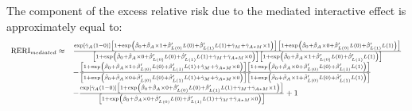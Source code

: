 \documentclass[
]{book}
\begin{document}
The component of the excess relative risk due to the mediated interactive effect is approximately equal to:
\[\small
\begin{array}{rl}
\text{RERI}_{mediated} \approx  & \frac{\exp \left[ \hat{\gamma}_A (1 - 0)\right] \left[1 + \exp \left(\hat{\beta}_0 + \hat{\beta}_A \times 1 + \hat{\beta}_{L(0)}^\prime L(0) + \hat{\beta}_{L(1)}^\prime L(1) + \hat{\gamma}_M + \hat{\gamma}_{A \ast M} \times 1\right) \right] \left[1 + \exp \left(\hat{\beta}_0 + \hat{\beta}_A \times 0 + \hat{\beta}_{L(0)}^\prime L(0) + \hat{\beta}_{L(1)}^\prime L(1)\right) \right]}{\left[ 1 + \exp \left(\hat{\beta}_0 + \hat{\beta}_A \times 0 + \hat{\beta}_{L(0)}^\prime L(0) + \hat{\beta}_{L(1)}^\prime L(1) + \hat{\gamma}_M + \hat{\gamma}_{A \ast M} \times 0\right)\right] \left[ 1 + \exp \left(\hat{\beta}_0 + \hat{\beta}_A \times 1 + \hat{\beta}_{L(0)}^\prime L(0) + \hat{\beta}_{L(1)}^\prime L(1) \right) \right]} \\
                                & - \frac{\left[1 + \exp \left(\hat{\beta}_0 + \hat{\beta}_A \times 1 + \hat{\beta}_{L(0)}^\prime L(0) + \hat{\beta}_{L(1)}^\prime L(1) + \hat{\gamma}_M + \hat{\gamma}_{A \ast M} \times 0\right) \right] \left[1 + \exp \left(\hat{\beta}_0 + \hat{\beta}_A \times 0 + \hat{\beta}_{L(0)}^\prime L(0) + \hat{\beta}_{L(1)}^\prime L(1) \right) \right]}{\left[ 1 + \exp \left(\hat{\beta}_0 + \hat{\beta}_A \times 0 + \hat{\beta}_{L(0)}^\prime L(0) + \hat{\beta}_{L(1)}^\prime L(1) + \hat{\gamma}_M + \hat{\gamma}_{A \ast M} \times 0 \right)\right] \left[ 1 + \exp \left(\hat{\beta}_0 + \hat{\beta}_A \times 1 + \hat{\beta}_{L(0)}^\prime L(0) + \hat{\beta}_{L(1)}^\prime L(1)  \right) \right]} \\
                                & - \frac{\exp \left[ \hat{\gamma}_A (1 - 0)\right] \left[1 + \exp \left(\hat{\beta}_0 + \hat{\beta}_A \times 0 + \hat{\beta}_{L(0)}^\prime L(0) + \hat{\beta}_{L(1)}^\prime L(1) + \hat{\gamma}_M + \hat{\gamma}_{A \ast M} \times 1 \right) \right]}{\left[ 1 + \exp \left(\hat{\beta}_0 + \hat{\beta}_A \times 0 + \hat{\beta}_{L(0)}^\prime L(0) + \hat{\beta}_{L(1)}^\prime L(1) + \hat{\gamma}_M + \hat{\gamma}_{A \ast M} \times 0 \right)\right]} + 1
\end{array}\]
\end{document}
